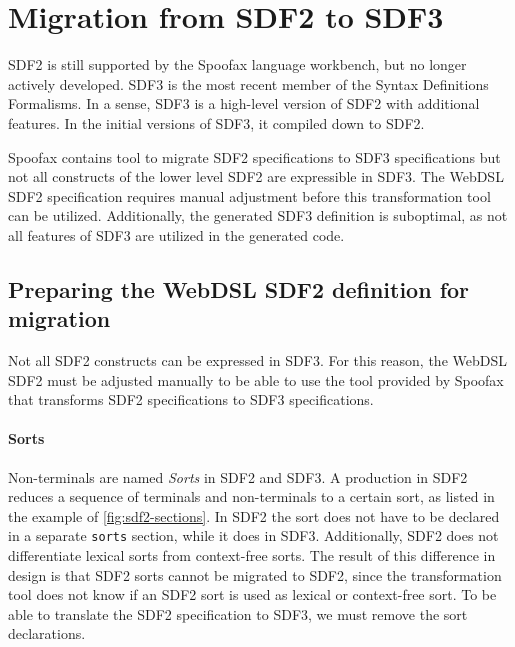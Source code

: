   \section{\label{sec:sdf2-to-sdf3}Migration from SDF2 to SDF3}

    SDF2 is still supported by the Spoofax language workbench, but no longer actively developed. SDF3 is the most recent member of the Syntax Definitions Formalisms. In a sense, SDF3 is a high-level version of SDF2 with additional features. In the initial versions of SDF3, it compiled down to SDF2.

    Spoofax contains tool to migrate SDF2 specifications to SDF3 specifications but not all constructs of the lower level SDF2 are expressible in SDF3. The WebDSL SDF2 specification requires manual adjustment before this transformation tool can be utilized. Additionally, the generated SDF3 definition is suboptimal, as not all features of SDF3 are utilized in the generated code.

    \subsection{\label{subsec:preparing-webdsl-sdf2}Preparing the WebDSL SDF2 definition for migration}

      Not all SDF2 constructs can be expressed in SDF3. For this reason, the WebDSL SDF2 must be adjusted manually to be able to use the tool provided by Spoofax that transforms SDF2 specifications to SDF3 specifications.

      \paragraph{Sorts} Non-terminals are named \textit{Sorts} in SDF2 and SDF3. A production in SDF2 reduces a sequence of terminals and non-terminals to a certain sort, as listed in the example of \cref{fig:sdf2-sections}. In SDF2 the sort does not have to be declared in a separate \texttt{sorts} section, while it does in SDF3. Additionally, SDF2 does not differentiate lexical sorts from context-free sorts. The result of this difference in design is that SDF2 sorts cannot be migrated to SDF2, since the transformation tool does not know if an SDF2 sort is used as lexical or context-free sort. To be able to translate the SDF2 specification to SDF3, we must remove the sort declarations.

